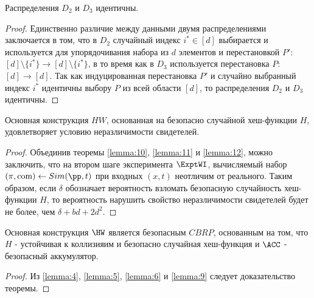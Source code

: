 \begin{theorem}
	\label{lemma:12}
	Распределения $D_2$ и $D_3$ идентичны.
\end{theorem}

\begin{proof}
	Единственно различие между данными двумя распределениями заключается в том, что в $D_2$ случайный индекс $i^* \in [d]$ выбирается и используется для упорядочивания набора из $d$ элементов и перестановкой $P'$: $[d] \setminus \{i^*\} \rightarrow [d] \setminus \{i^*\}$, в то время как в $D_3$ используется перестановка $P$: $[d] \rightarrow [d]$.
	Так как индуцированная перестановка $P'$ и случайно выбранный индекс $i^*$ идентичны выбору $P$ из всей области $[d]$, то распределения $D_2$ и $D_3$ идентичны.
\end{proof}

\begin{theorem}
	\label{lemma:9}
	Основная конструкция $HW$, основанная на безопасно случайной хеш-функции $H$, удовлетворяет условию неразличимости свидетелей.
\end{theorem}

\begin{proof}
	Объединив теоремы \ref{lemma:10}, \ref{lemma:11} и \ref{lemma:12}, можно заключить, что на втором шаге эксперимента $\ExptWI$, вычисляемый набор $(\pi, \com) \leftarrow Sim(\pp, t)$ при входных $(x, t)$ неотличим от реального.
	Таким образом, если $\delta$ обозначает вероятность взломать безопасную случайность хеш-функции $H$, то вероятность нарушить свойство неразличимости свидетелей будет не более, чем $\delta + bd + 2d^2$.
\end{proof}

\begin{theorem}
	\label{theorem:2}
	Основная конструкция $\HW$ является безопасным $CBRP$, основанным на том, что $H$ - устойчивая к коллизияим и безопасно случайная хеш-функция и $\ACC$ - безопасный аккумулятор.
\end{theorem}

\begin{proof}
	Из \ref{lemma:4}, \ref{lemma:5}, \ref{lemma:6} и \ref{lemma:9} следует доказательство теоремы.
\end{proof}
